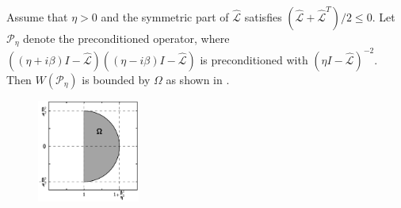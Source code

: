 \documentclass[review]{siamart}
\begin{document}
%
\begin{theorem}\label{th:fov}
Assume that $\eta > 0$ and the symmetric part of $\widehat{\mathcal{L}}$ satisfies
$(\widehat{\mathcal{L}}+\widehat{\mathcal{L}}^T)/2 \leq 0$. Let $\mathcal{P}_\eta$ denote the preconditioned
operator, where $((\eta + i\beta)I - \widehat{\mathcal{L}})((\eta - i\beta)I - \widehat{\mathcal{L}})$ is
preconditioned with $(\eta I - \widehat{\mathcal{L}})^{-2}$. Then $W(\mathcal{P}_\eta)$ is bounded
by $\Omega$ as shown in .
\begin{figure}[h!]
\centering
\includegraphics[width = 0.3\textwidth]{fov.pdf}
\caption{}
\label{fig:bound}
\end{figure}
\end{theorem}
\end{document}
